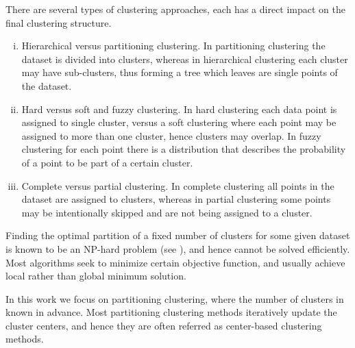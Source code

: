 There are several types of clustering approaches, each has a direct impact on the final clustering structure.
\begin{enumerate}[(i)]
	\item Hierarchical versus partitioning clustering. In partitioning clustering the dataset is divided into clusters, whereas in hierarchical clustering each cluster may have sub-clusters, thus forming a tree which leaves are single points of the dataset.
	\item Hard versus soft and fuzzy clustering. In hard clustering each data point is assigned to single cluster, versus a soft clustering where each point may be assigned to more than one cluster, hence clusters may overlap. In fuzzy clustering for each point there is a distribution that describes the probability of a point to be part of a certain cluster.
	\item Complete versus partial clustering. In complete clustering all points in the dataset are assigned to clusters, whereas in partial clustering some points may be intentionally skipped and are not being assigned to a cluster.
\end{enumerate}

Finding the optimal partition of a fixed number of clusters for some given dataset is known to be an NP-hard problem (see \cite{GJ1979}), and hence cannot be solved efficiently. Most algorithms seek to minimize certain objective function, and usually achieve local rather than global minimum solution. \medskip

In this work we focus on partitioning clustering, where the number of clusters in known in advance. Most partitioning clustering methods iteratively update the cluster centers, and hence they are often referred as center-based clustering methods. \medskip


